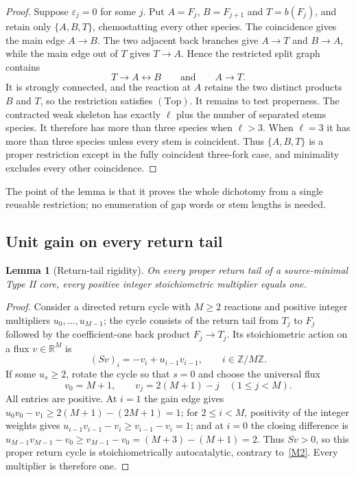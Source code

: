 \documentclass[11pt,reqno]{amsart}
\theoremstyle{plain}
\newtheorem{lemma}[theorem]{Lemma}
\theoremstyle{definition}
\theoremstyle{remark}
\numberwithin{equation}{section}
\newcommand{\R}{\mathbb{R}}
\newcommand{\Z}{\mathbb{Z}}
\newcommand{\Top}{\mathrm{(Top)}}
\begin{document}
\begin{proof}
Suppose $\varepsilon_j=0$ for some $j$.  Put $A=F_j$, $B=F_{j+1}$ and $T=b(F_j)$, and retain only $\{A,B,T\}$, chemostatting every other species.  The coincidence gives the main edge $A\to B$.  The two adjacent back branches give $A\to T$ and $B\to A$, while the main edge out of $T$ gives $T\to A$.  Hence the restricted split graph contains
\begin{equation}\label{eq:star}
T\to A\leftrightarrow B\qquad\text{and}\qquad A\to T .
\end{equation}
It is strongly connected, and the reaction at $A$ retains the two distinct products $B$ and $T$, so the restriction satisfies $\Top$.  It remains to test properness.  The contracted weak skeleton has exactly $\ell$ plus the number of separated stems species.  It therefore has more than three species when $\ell>3$.  When $\ell=3$ it has more than three species unless every stem is coincident.  Thus $\{A,B,T\}$ is a proper restriction except in the fully coincident three-fork case, and minimality excludes every other coincidence.
\end{proof}

The point of the lemma is that it proves the whole dichotomy from a single reusable restriction; no enumeration of gap words or stem lengths is needed.

\subsection{Unit gain on every return tail}

\begin{lemma}[Return-tail rigidity]\label{lem:tail}
On every proper return tail of a source-minimal Type II core, every positive integer stoichiometric multiplier equals one.
\end{lemma}

\begin{proof}
Consider a directed return cycle with $M\ge2$ reactions and positive integer multipliers $u_0,\dots,u_{M-1}$; the cycle consists of the return tail from $T_j$ to $F_j$ followed by the coefficient-one back product $F_j\to T_j$.  Its stoichiometric action on a flux $v\in\R^M$ is
\begin{equation}\label{eq:Sv}
(Sv)_i=-v_i+u_{i-1}v_{i-1},\qquad i\in\Z/M\Z .
\end{equation}
If some $u_s\ge2$, rotate the cycle so that $s=0$ and choose the universal flux
\begin{equation}\label{eq:flux}
v_0=M+1,\qquad v_j=2(M+1)-j\quad(1\le j<M).
\end{equation}
All entries are positive.  At $i=1$ the gain edge gives $u_0v_0-v_1\ge 2(M+1)-(2M+1)=1$; for $2\le i<M$, positivity of the integer weights gives $u_{i-1}v_{i-1}-v_i\ge v_{i-1}-v_i=1$; and at $i=0$ the closing difference is $u_{M-1}v_{M-1}-v_0\ge v_{M-1}-v_0=(M+3)-(M+1)=2$.  Thus $Sv>0$, so this proper return cycle is stoichiometrically autocatalytic, contrary to~\ref{M2}.  Every multiplier is therefore one.
\end{proof}
\end{document}
